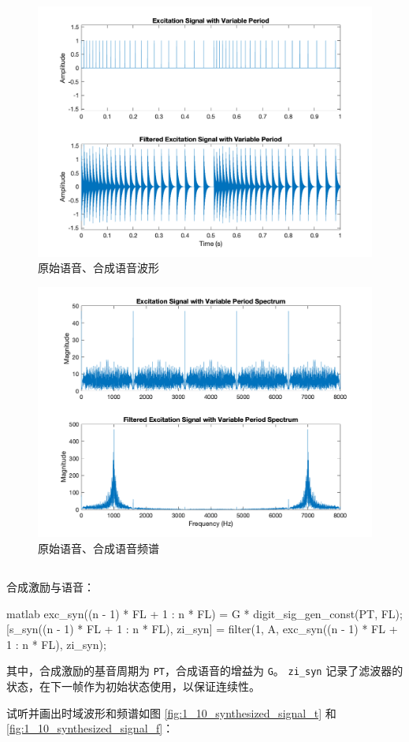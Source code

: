 \documentclass[a4paper]{article}  %
\begin{document}
\begin{figure}[ht]
    \centering
    \includegraphics[width=.6\textwidth]{asserts/1_9_signal_t.png}
    \caption{
        原始语音、合成语音波形
    }\label{fig:1_9_signal_t}
\end{figure}

\begin{figure}[ht]
    \centering
    \includegraphics[width=.6\textwidth]{asserts/1_9_signal_f.png}
    \caption{
        原始语音、合成语音频谱
    }\label{fig:1_9_signal_f}
\end{figure}

\subsection{}

合成激励与语音：
\begin{codeblock}{matlab}
exc_syn((n - 1) * FL + 1 : n * FL) = G * digit_sig_gen_const(PT, FL);
[s_syn((n - 1) * FL + 1 : n * FL), zi_syn] = filter(1, A, exc_syn((n - 1) * FL + 1 : n * FL), zi_syn);
\end{codeblock}

其中，合成激励的基音周期为 \texttt{PT}，合成语音的增益为 \texttt{G}。
\texttt{zi\_syn} 记录了滤波器的状态，在下一帧作为初始状态使用，以保证连续性。

试听并画出时域波形和频谱如图 \ref{fig:1_10_synthesized_signal_t} 和 \ref{fig:1_10_synthesized_signal_f}：
\end{document}
